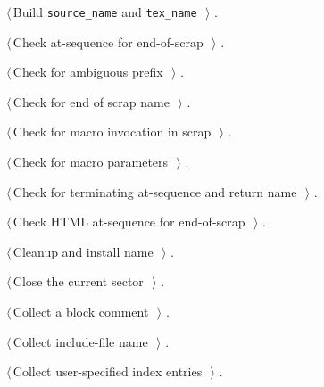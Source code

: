 \documentclass[a4paper]{report}
\begin{document}
{\begin{list}{}{\setlength{\itemsep}{-\parsep}\setlength{\itemindent}{-\leftmargin}}
\item $\langle\,$Build \verb|source_name| and \verb|tex_name|\nobreak\ {\footnotesize {}}$\,\rangle$ {\footnotesize {\NWtxtRefIn} .}
\item $\langle\,$Check at-sequence for end-of-scrap\nobreak\ {\footnotesize {}}$\,\rangle$ {\footnotesize {\NWtxtRefIn} .}
\item $\langle\,$Check for ambiguous prefix\nobreak\ {\footnotesize {}}$\,\rangle$ {\footnotesize {\NWtxtRefIn} .}
\item $\langle\,$Check for end of scrap name\nobreak\ {\footnotesize {}}$\,\rangle$ {\footnotesize {\NWtxtRefIn} .}
\item $\langle\,$Check for macro invocation in scrap\nobreak\ {\footnotesize {}}$\,\rangle$ {\footnotesize {\NWtxtRefIn} .}
\item $\langle\,$Check for macro parameters\nobreak\ {\footnotesize {}}$\,\rangle$ {\footnotesize {\NWtxtRefIn} .}
\item $\langle\,$Check for terminating at-sequence and return name\nobreak\ {\footnotesize {}}$\,\rangle$ {\footnotesize {\NWtxtRefIn} .}
\item $\langle\,$Check HTML at-sequence for end-of-scrap\nobreak\ {\footnotesize {}}$\,\rangle$ {\footnotesize {\NWtxtRefIn} .}
\item $\langle\,$Cleanup and install name\nobreak\ {\footnotesize {}}$\,\rangle$ {\footnotesize {\NWtxtRefIn} .
}
\item $\langle\,$Close the current sector\nobreak\ {\footnotesize {}}$\,\rangle$ {\footnotesize {\NWtxtRefIn} .
}
\item $\langle\,$Collect a block comment\nobreak\ {\footnotesize {}}$\,\rangle$ {\footnotesize {\NWtxtRefIn} .}
\item $\langle\,$Collect include-file name\nobreak\ {\footnotesize {}}$\,\rangle$ {\footnotesize {\NWtxtRefIn} .}
\item $\langle\,$Collect user-specified index entries\nobreak\ {\footnotesize {}}$\,\rangle$ {\footnotesize {\NWtxtRefIn} .}

\end{list}}
\end{document}
